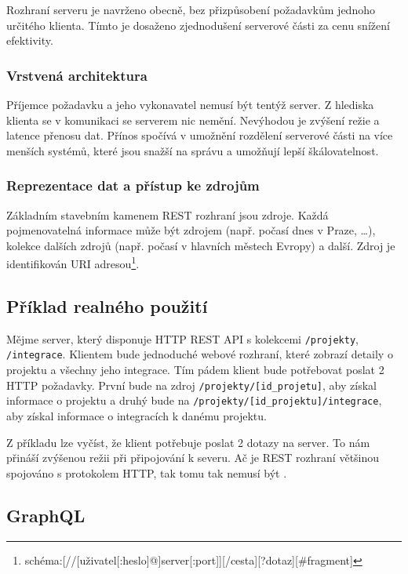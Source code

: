 Rozhraní serveru je navrženo obecně, bez přizpůsobení požadavkům jednoho určitého klienta.
Tímto je dosaženo zjednodušení serverové části za cenu snížení efektivity.
\cite{rest_uniformni}

\subsubsection{Vrstvená architektura}

Příjemce požadavku a jeho vykonavatel nemusí být tentýž server.
Z hlediska klienta se v komunikaci se serverem nic nemění.
Nevýhodou je zvýšení režie a latence přenosu dat.
Přínos spočívá v umožnění rozdělení serverové části na více menších systémů, které jsou snažší na správu a umožňují lepší škálovatelnost.
\cite{rest_architektura}

\subsubsection{Reprezentace dat a přístup ke zdrojům}

Základním stavebním kamenem REST rozhraní jsou zdroje.
Každá pojmenovatelná informace může být zdrojem (např. počasí dnes v Praze, \ldots), kolekce dalších zdrojů (např. počasí v hlavních městech Evropy) a další.
Zdroj je identifikován URI adresou\footnote{schéma:[//[uživatel[:heslo]@]server[:port]][/cesta][?dotaz][\#fragment]}.
\cite{rest_zdroje}

\subsection{Příklad realného použití}

Mějme server, který disponuje HTTP REST API s kolekcemi \verb|/projekty|, \verb|/integrace|.
Klientem bude jednoduché webové rozhraní, které zobrazí detaily o projektu a všechny jeho integrace.
Tím pádem klient bude potřebovat poslat 2 HTTP požadavky.
První bude na zdroj \verb|/projekty/[id_projetu]|, aby získal informace o projektu a druhý bude na \verb|/projekty/[id_projektu]/integrace|, aby získal informace o integracích k danému projektu.

Z příkladu lze vyčíst, že klient potřebuje poslat 2 dotazy na server.
To nám přináší zvýšenou režii při připojování k severu.
Ač je REST rozhraní většinou spojováno s protokolem HTTP, tak tomu tak nemusí být \cite{rest_http}.

\subsection{GraphQL}

